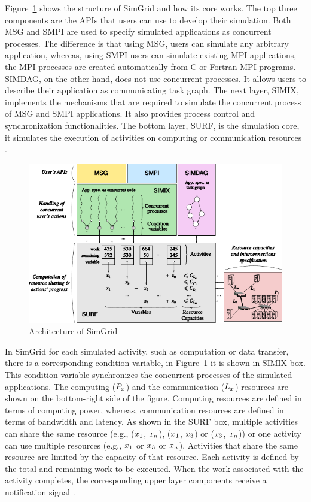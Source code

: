 Figure~\ref{fig:SimGrid} shows the structure of SimGrid and how its core works. The top three components are the APIs that users can use to develop their simulation. Both MSG and SMPI are used to specify simulated applications as concurrent processes. The difference is that using MSG, users can simulate any arbitrary application, whereas, using SMPI users can simulate existing MPI applications, the MPI processes are created automatically from C or Fortran MPI programs. SIMDAG, on the other hand, does not use concurrent processes. It allows users to describe their application as communicating task graph. The next layer, SIMIX, implements the mechanisms that are required to simulate the concurrent process of MSG and SMPI applications. It also provides process control and synchronization functionalities. The bottom layer, SURF, is the simulation core, it simulates the execution of activities on computing or communication resources \cite{DBLP:journals/jpdc/CasanovaGLQS14}.
\begin{figure}[ht]
	\begin{center}
		\includegraphics{images/SimGrid.pdf}
		\caption{Architecture of SimGrid \cite{DBLP:journals/jpdc/CasanovaGLQS14}}
		\label{fig:SimGrid}
	\end{center}
\end{figure}
In SimGrid for each simulated activity, such as computation or data transfer, there is a corresponding condition variable, in Figure~\ref{fig:SimGrid} it is shown in SIMIX box. This condition variable synchronizes the concurrent processes of the simulated applications. The computing (\($$P_{x}$$\)) and the communication (\($$L_{x}$$\)) resources are shown on the bottom-right side of the figure. Computing resources are defined in terms of computing power, whereas, communication resources are defined in terms of bandwidth and latency. As shown in the SURF box, multiple activities can share the same resource (e.g., (\($$x_{1}$$\), \($$x_{n}$$\)), (\($$x_{1}$$\), \($$x_{3}$$\)) or (\($$x_{3}$$\), \($$x_{n}$$\))) or one activity can use multiple resources (e.g., \($$x_{1}$$\) or \($$x_{3}$$\) or  \($$x_{n}$$\)). Activities that share the same resource are limited by the capacity of that resource. Each activity is defined by the total and remaining work to be executed. When the work associated with the activity completes, the corresponding upper layer components receive a notification signal \cite{DBLP:journals/jpdc/CasanovaGLQS14}.


